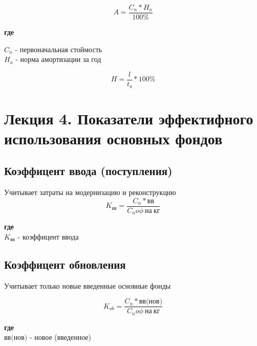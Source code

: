 \documentclass[11pt]{article}
\begin{document}
\begin{equation}  
A = \frac{C_{n}*H_{a}}{100\%}
\end{equation}

\textbf{где} \\

\begin{flushleft}
$C_{n}$ - первоначальная стоймость \\
$H_{a}$ - норма амортизации за год \\
\end{flushleft}


\begin{equation}
H=\frac{l}{t_{\text{э}}}*100\%  
\end{equation}

\section{Лекция 4. Показатели эффектифного использования основных фондов}
\label{sec:orgd451fec}

\subsection{Коэффицент ввода (поступления)}
\label{sec:orgaba2f74}

Учитывает затраты на модернизацию и реконструкцию \\

\begin{equation}
  K_{\text{вв}} = \frac{C_{n}*\text{вв}}{C_{n}o\phi \  \text{на} \   \text{кг}}
\end{equation}

\textbf{где} \\

\(K_\text{вв}\) - коэффицент ввода

\subsection{Коэффицент обновления}
\label{sec:org194106e}

Учитывает только новые введенные основные фонды

\begin{equation}
  K_{ob} = \frac{C_{n}*\text{вв(нов)}}{C_{n}o\phi \  \text{на} \  \text{кг}}
\end{equation}

\textbf{где} \\

\(\text{вв(нов)}\) - новое (введенное)
\end{document}
